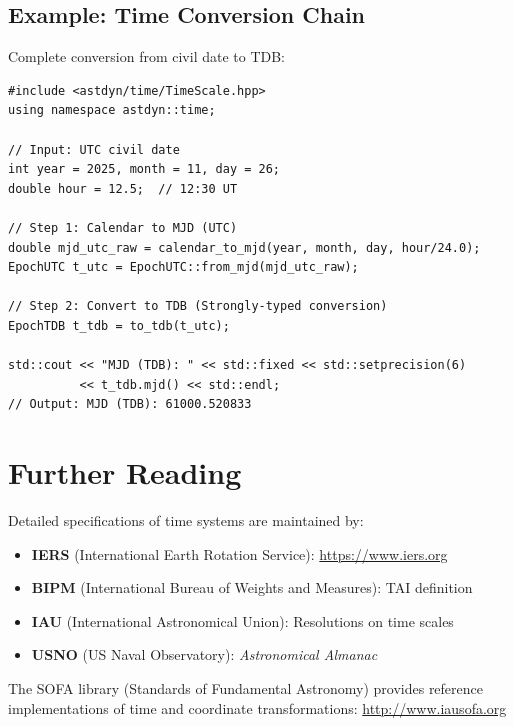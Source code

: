 \subsection{Example: Time Conversion Chain}

Complete conversion from civil date to TDB:

\begin{lstlisting}[style=cpp,caption={Converting calendar date to TDB}]
#include <astdyn/time/TimeScale.hpp>
using namespace astdyn::time;

// Input: UTC civil date
int year = 2025, month = 11, day = 26;
double hour = 12.5;  // 12:30 UT

// Step 1: Calendar to MJD (UTC)
double mjd_utc_raw = calendar_to_mjd(year, month, day, hour/24.0);
EpochUTC t_utc = EpochUTC::from_mjd(mjd_utc_raw);

// Step 2: Convert to TDB (Strongly-typed conversion)
EpochTDB t_tdb = to_tdb(t_utc);

std::cout << "MJD (TDB): " << std::fixed << std::setprecision(6) 
          << t_tdb.mjd() << std::endl;
// Output: MJD (TDB): 61000.520833
\end{lstlisting}

\section{Further Reading}

Detailed specifications of time systems are maintained by:
\begin{itemize}
    \item \textbf{IERS} (International Earth Rotation Service): \url{https://www.iers.org}
    \item \textbf{BIPM} (International Bureau of Weights and Measures): TAI definition
    \item \textbf{IAU} (International Astronomical Union): Resolutions on time scales
    \item \textbf{USNO} (US Naval Observatory): \textit{Astronomical Almanac}
\end{itemize}

The SOFA library (Standards of Fundamental Astronomy) provides reference implementations of time and coordinate transformations: \url{http://www.iausofa.org}
